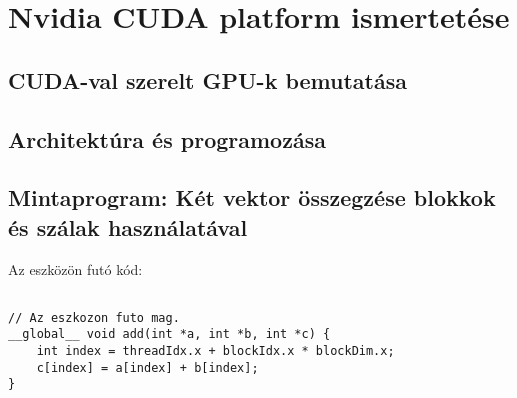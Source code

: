 \chapter{Nvidia CUDA platform ismertetése}

\section{CUDA-val szerelt GPU-k bemutatása}


\section{Architektúra és programozása}



\section{Mintaprogram: Két vektor összegzése blokkok és szálak használatával}

Az eszközön futó kód:
\begin{lstlisting}[frame=single]  % Start your code-block

// Az eszkozon futo mag.
__global__ void add(int *a, int *b, int *c) {
    int index = threadIdx.x + blockIdx.x * blockDim.x;
    c[index] = a[index] + b[index];
}
\end{lstlisting}















